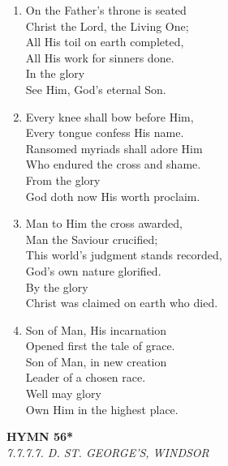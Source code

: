 \begin{enumerate}
    \item On the Father's throne is seated \\
        Christ the Lord, the Living One; \\
        All His toil on earth completed, \\
        All His work for sinners done. \\
        In the glory \\
        See Him, God's eternal Son.

    \item Every knee shall bow before Him, \\
        Every tongue confess His name. \\
        Ransomed myriads shall adore Him \\
        Who endured the cross and shame. \\
        From the glory \\
        God doth now His worth proclaim.

    \item Man to Him the cross awarded, \\
        Man the Saviour crucified; \\
        This world's judgment stands recorded, \\
        God's own nature glorified. \\
        By the glory \\
        Christ was claimed on earth who died.

    \item Son of Man, His incarnation \\
        Opened first the tale of grace. \\
        Son of Man, in new creation \\
        Leader of a chosen race. \\
        Well may glory \\
        Own Him in the highest place.

\end{enumerate}

\newpage
\begin{center}
    {\Large \textbf{HYMN 56*}}
    \\
    \textit{7.7.7.7. D. ST. GEORGE'S, WINDSOR}
\end{center}
\vspace{1em}


